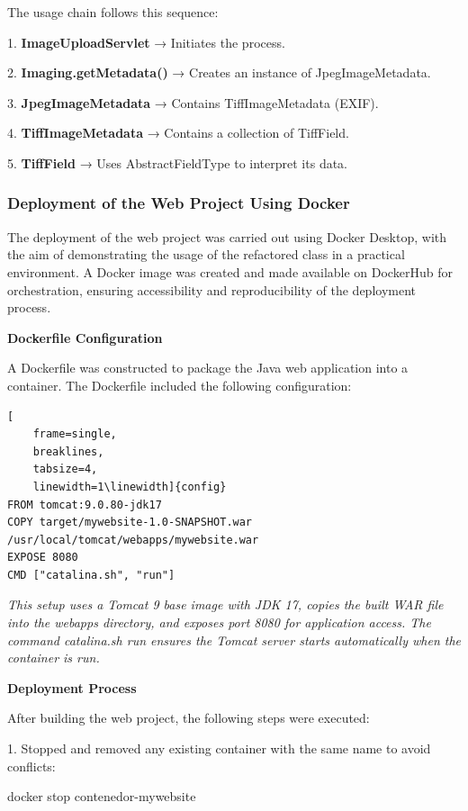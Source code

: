 \documentclass[sigconf]{acmart}
\begin{document}
The usage chain follows this sequence:

    1. \textbf{ImageUploadServlet} → Initiates the process.
    
    2. \textbf{Imaging.getMetadata()} → Creates an instance of JpegImageMetadata.
    
    3. \textbf{JpegImageMetadata} → Contains TiffImageMetadata (EXIF).
    
    4. \textbf{TiffImageMetadata} → Contains a collection of TiffField.
    
    5. \textbf{TiffField} → Uses AbstractFieldType to interpret its data.
\newpage

\subsubsection{Deployment of the Web Project Using Docker}

The deployment of the web project was carried out using Docker Desktop, with the aim of demonstrating the usage of the refactored class in a practical environment. A Docker image was created and made available on DockerHub for orchestration, ensuring accessibility and reproducibility of the deployment process.

\textbf{Dockerfile Configuration}

A Dockerfile was constructed to package the Java web application into a container. The Dockerfile included the following configuration:


\begin{lstlisting}[
    frame=single,
    breaklines,
    tabsize=4,
    linewidth=1\linewidth]{config}
FROM tomcat:9.0.80-jdk17
COPY target/mywebsite-1.0-SNAPSHOT.war /usr/local/tomcat/webapps/mywebsite.war
EXPOSE 8080
CMD ["catalina.sh", "run"]
\end{lstlisting}

\textit{This setup uses a Tomcat 9 base image with JDK 17, copies the built WAR file into the webapps directory, and exposes port 8080 for application access. The command catalina.sh run ensures the Tomcat server starts automatically when the container is run.}

\vspace{0,5cm}
\textbf{Deployment Process}

After building the web project, the following steps were executed:
    
    1. Stopped and removed any existing container with the same name to avoid conflicts:
    
docker stop contenedor-mywebsite
\end{document}
